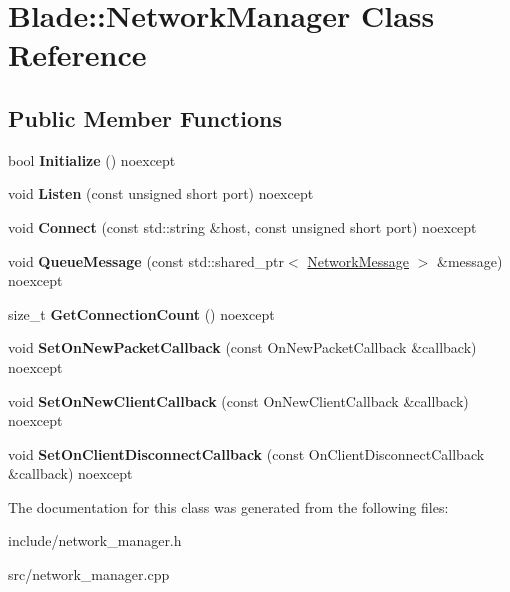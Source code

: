 \hypertarget{class_blade_1_1_network_manager}{}\section{Blade\+:\+:Network\+Manager Class Reference}
\label{class_blade_1_1_network_manager}
\subsection*{Public Member Functions}
\begin{DoxyCompactItemize}
\item 
\mbox{\label{class_blade_1_1_network_manager_a9b1c863473df3dddfd4347c4fa570a80}} 
bool {\bfseries Initialize} () noexcept
\item 
\mbox{\label{class_blade_1_1_network_manager_a1e097a251026499832bd7238adb48d8a}} 
void {\bfseries Listen} (const unsigned short port) noexcept
\item 
\mbox{\label{class_blade_1_1_network_manager_a61a872d6eec9050280dc041a7cda3759}} 
void {\bfseries Connect} (const std\+::string \&host, const unsigned short port) noexcept
\item 
\mbox{\label{class_blade_1_1_network_manager_a3127ee70f644dedfa8be9372805f6d5a}} 
void {\bfseries Queue\+Message} (const std\+::shared\+\_\+ptr$<$ \hyperlink{class_blade_1_1_network_message}{Network\+Message} $>$ \&message) noexcept
\item 
\mbox{\label{class_blade_1_1_network_manager_ac8dcbba66d285f6a14ad1bcfa346ae5e}} 
size\+\_\+t {\bfseries Get\+Connection\+Count} () noexcept
\item 
\mbox{\label{class_blade_1_1_network_manager_a12f5afdfc075b71ea82d4d657a78d780}} 
void {\bfseries Set\+On\+New\+Packet\+Callback} (const On\+New\+Packet\+Callback \&callback) noexcept
\item 
\mbox{\label{class_blade_1_1_network_manager_a192f822f26e76829c2414f1505418a78}} 
void {\bfseries Set\+On\+New\+Client\+Callback} (const On\+New\+Client\+Callback \&callback) noexcept
\item 
\mbox{\label{class_blade_1_1_network_manager_ada4cd3f291d3775e7467c5be31090a99}} 
void {\bfseries Set\+On\+Client\+Disconnect\+Callback} (const On\+Client\+Disconnect\+Callback \&callback) noexcept
\end{DoxyCompactItemize}


The documentation for this class was generated from the following files\+:\begin{DoxyCompactItemize}
\item 
include/network\+\_\+manager.\+h\item 
src/network\+\_\+manager.\+cpp\end{DoxyCompactItemize}
